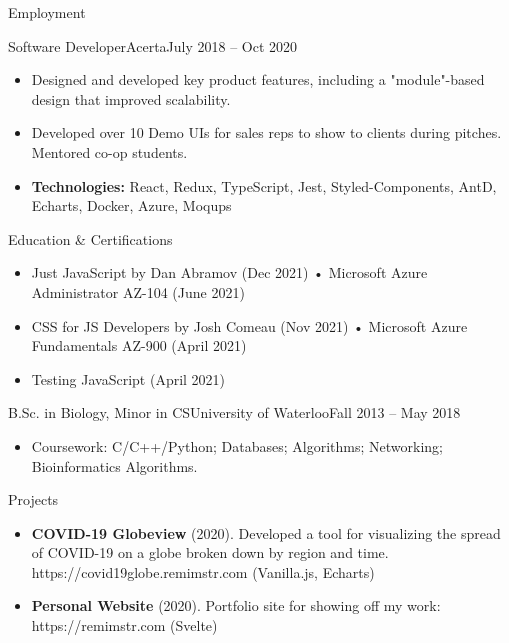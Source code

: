 \documentclass[]{mcdowellcv}
\begin{document}
\begin{cvsection}{Employment}
		\begin{cvsubsection}{Software Developer}{Acerta}{July 2018 -- Oct 2020}
			\begin{itemize}
				\item Designed and developed key product features, including a "module"-based design that improved scalability.
				\item Developed over 10 Demo UIs for sales reps to show to clients during pitches. Mentored co-op students.
				\item \textbf{Technologies:} React, Redux, TypeScript, Jest, Styled-Components, AntD, Echarts, Docker, Azure, Moqups
			\end{itemize}
		\end{cvsubsection}

	\end{cvsection}

	\begin{cvsection}{Education \& Certifications}
		\begin{cvsubsection}{}{}{}
			\begin{itemize}
			    \item Just JavaScript by Dan Abramov (Dec 2021)  \hspace{1.41cm} • Microsoft Azure Administrator AZ-104 (June 2021)
			    \item CSS for JS Developers by Josh Comeau (Nov 2021) \hspace{0.25cm} • Microsoft Azure Fundamentals AZ-900 (April 2021)
				\item Testing JavaScript (April 2021)
			\end{itemize}
		\end{cvsubsection}
		\begin{cvsubsection}{B.Sc. in Biology, Minor in CS}{University of Waterloo}{Fall 2013 -- May 2018}
			\begin{itemize}
				\item Coursework: C/C++/Python; Databases; Algorithms; Networking; Bioinformatics Algorithms.
			\end{itemize}
		\end{cvsubsection}
	\end{cvsection}

	\begin{cvsection}{Projects}
		\begin{cvsubsection}{}{}{}
			\begin{itemize}
				\item \textbf{COVID-19 Globeview} (2020). Developed a tool for visualizing the spread of COVID-19 on a globe broken down by region and time.
					https://covid19globe.remimstr.com (Vanilla.js, Echarts)
				\item \textbf{Personal Website} (2020). Portfolio site for showing off my work: https://remimstr.com (Svelte)
			\end{itemize}
		\end{cvsubsection}
	\end{cvsection}
\end{document}
